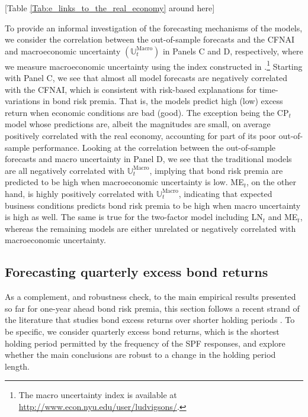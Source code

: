 \documentclass[12pt,letterpaper,leqno,doublespacing]{article}
\begin{document}
\begin{center}
    [Table \ref{Tab:e_links_to_the_real_economy} around here]
\end{center}

To provide an informal investigation of the forecasting mechanisms of the models, we consider the correlation between the out-of-sample forecasts and the CFNAI and macroeconomic uncertainty $\left(\mathbb{U}_{t}^{\text{Macro}}\right)$ in Panels C and D, respectively, where we measure macroeconomic uncertainty using the index constructed in \cite{JuradoLudvgisonNg2015}.\footnote{The macro uncertainty index is available at \url{http://www.econ.nyu.edu/user/ludvigsons/}.} Starting with Panel C, we see that almost all model forecasts are negatively correlated with the CFNAI, which is consistent with risk-based explanations for time-variations in bond risk premia. That is, the models predict high (low) excess return when economic conditions are bad (good). The exception being the CP$_{t}$ model whose predictions are, albeit the magnitudes are small, on average positively correlated with the real economy, accounting for part of its poor out-of-sample performance. Looking at the correlation between the out-of-sample forecasts and macro uncertainty in Panel D, we see that the traditional models are all negatively correlated with $\mathbb{U}_{t}^{\text{Macro}}$, implying that bond risk premia are predicted to be high when macroeconomic uncertainty is low. ME$_{t}$, on the other hand, is highly positively correlated with $\mathbb{U}_{t}^{\text{Macro}}$, indicating that expected business conditions predicts bond risk premia to be high when macro uncertainty is high as well. The same is true for the two-factor model including LN$_{t}$ and ME$_{t}$, whereas the remaining models are either unrelated or negatively correlated with macroeconomic uncertainty.   


\subsection{Forecasting quarterly excess bond returns}\label{sec:e_forecasting_quarterly_excess_bond_returns}
As a complement, and robustness check, to the main empirical results presented so far for one-year ahead bond risk premia, this section follows a recent strand of the literature that studies bond excess returns over shorter holding periods \citep{GarganoPettenuzzoTimmermann2014,AndreasenEngstedMoellerSander2014}. To be specific, we consider quarterly excess bond returns, which is the shortest holding period permitted by the frequency of the SPF responses, and explore whether the main conclusions are robust to a change in the holding period length. 
\end{document}
